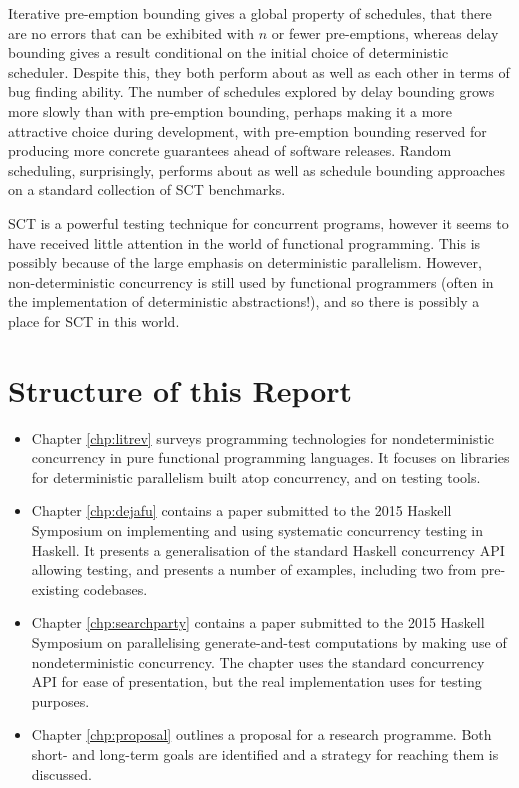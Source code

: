 Iterative pre-emption bounding gives a global property of schedules,
that there are no errors that can be exhibited with $n$ or fewer
pre-emptions, whereas delay bounding gives a result conditional on the
initial choice of deterministic scheduler. Despite this, they both
perform about as well as each other in terms of bug finding
ability\cite{empirical}. The number of schedules explored by delay
bounding grows more slowly than with pre-emption
bounding\cite{dbound}, perhaps making it a more attractive choice
during development, with pre-emption bounding reserved for producing
more concrete guarantees ahead of software releases. Random
scheduling, surprisingly, performs about as well as schedule bounding
approaches on a standard collection of SCT benchmarks\cite{empirical}.

SCT is a powerful testing technique for concurrent programs, however
it seems to have received little attention in the world of functional
programming. This is possibly because of the large emphasis on
deterministic parallelism. However, non-deterministic concurrency is
still used by functional programmers (often in the implementation of
deterministic abstractions!), and so there is possibly a place for SCT
in this world.

\section{Structure of this Report}
\label{sec:intro-outline}

\begin{itemize}
  \item Chapter \ref{chp:litrev} surveys programming technologies for
    nondeterministic concurrency in pure functional programming
    languages. It focuses on libraries for deterministic parallelism
    built atop concurrency, and on testing tools.

  \item Chapter \ref{chp:dejafu} contains a paper submitted to the
    2015 Haskell Symposium\cite{dejafu} on implementing and using
    systematic concurrency testing in Haskell. It presents a
    generalisation of the standard Haskell concurrency API allowing
    testing, and presents a number of examples, including two from
    pre-existing codebases.

  \item Chapter \ref{chp:searchparty} contains a paper submitted to
    the 2015 Haskell Symposium\cite{searchparty} on parallelising
    generate-and-test computations by making use of nondeterministic
    concurrency. The chapter uses the standard concurrency API for
    ease of presentation, but the real implementation uses \dejafu{}
    for testing purposes.

  \item Chapter \ref{chp:proposal} outlines a proposal for a research
    programme. Both short- and long-term goals are identified and a
    strategy for reaching them is discussed.
\end{itemize}
